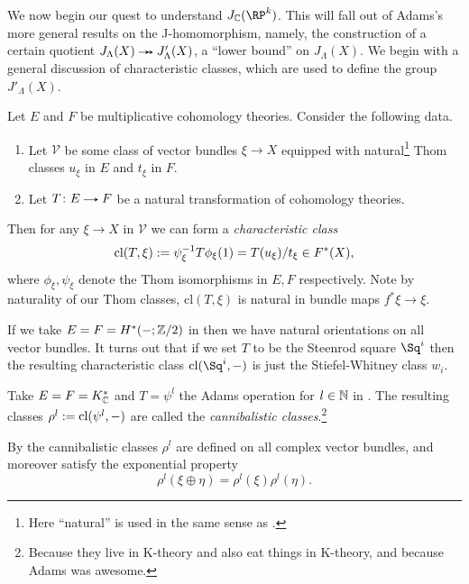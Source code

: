 We now begin our quest to understand $J_\C(\RP^k)$. This will fall
out of Adams's more general results on the J-homomorphism, namely, the
construction of a certain quotient $J_\Lambda(X) \surj
J'_\Lambda(X)$, a ``lower bound'' on $J_\Lambda(X)$. We begin with a
general discussion of characteristic classes, which are used to define
the group $J'_\Lambda(X)$.

\renewcommand{\V}{\mathcal{V}}
\newcommand{\cl}{\mathrm{cl}}
\begin{nothing}
  \label{chclass-general}
  Let $E$ and $F$ be multiplicative cohomology theories. Consider the
  following data.
  \begin{enumerate}
  \item Let $\V$ be some class of vector bundles $\xi \to X$ equipped
    with natural\footnote{Here ``natural'' is used in the same sense
      as .} Thom classes $u_\xi$ in $E$ and $t_\xi$ in
    $F$.
  \item Let $T \c E \to F$ be a natural transformation of cohomology
    theories.
  \end{enumerate}
  Then for any $\xi \to X$ in $\V$ we can form a \emph{characteristic
    class}
  \[
  \cl(T,\xi) \ce \psi_\xi^{-1}T\phi_\xi(1) = T(u_\xi)/t_\xi \in
  F^*(X),
  \]
  where $\phi_\xi,\psi_\xi$ denote the Thom isomorphisms in $E,F$
  respectively. Note by naturality of our Thom classes, $\cl(T,\xi)$
  is natural in bundle maps $f^*\xi \to \xi$.
\end{nothing}

\begin{example}
  \label{stiefel-whitney}
  If we take $E = F = H^*(-;\mathbb{Z}/2)$ in  then we
  have natural orientations on all vector bundles. It turns out that
  if we set $T$ to be the Steenrod square $\Sq^i$ then the resulting
  characteristic class $\cl(\Sq^i,-)$ is just the Stiefel-Whitney
  class $w_i$.
\end{example}

\begin{definition}
  Take $E = F = K_{\mathbb{C}}^*$ and $T = \psi^l$ the Adams operation for $l
  \in \mathbb{N}$ in . The resulting classes $\rho^l \ce
  \cl(\psi^l,-)$ are called the \emph{cannibalistic
    classes}.\footnote{Because they live in K-theory and also eat
    things in K-theory, and because Adams was awesome.}
\end{definition}

\begin{remark}
  By  the cannibalistic classes $\rho^l$ are defined on
  all complex vector bundles, and moreover satisfy the exponential
  property
  \begin{equation}
    \label{exponential}
    \rho^l(\xi \oplus \eta) = \rho^l(\xi)\rho^l(\eta).
  \end{equation}
\end{remark}

